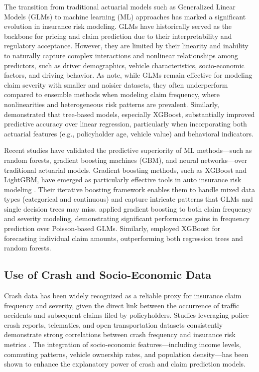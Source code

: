 \documentclass[
  number,
  review,
  3p]{elsarticle}
\begin{document}
The transition from traditional actuarial models such as Generalized
Linear Models (GLMs) to machine learning (ML) approaches has marked a
significant evolution in insurance risk modeling. GLMs have historically
served as the backbone for pricing and claim prediction due to their
interpretability and regulatory acceptance. However, they are limited by
their linearity and inability to naturally capture complex interactions
and nonlinear relationships among predictors, such as driver
demographics, vehicle characteristics, socio-economic factors, and
driving behavior. As \citet{clemente} note, while GLMs remain effective
for modeling claim severity with smaller and noisier datasets, they
often underperform compared to ensemble methods when modeling claim
frequency, where nonlinearities and heterogeneous risk patterns are
prevalent. Similarly, \citet{jonkheijm} demonstrated that tree-based
models, especially XGBoost, substantially improved predictive accuracy
over linear regression, particularly when incorporating both actuarial
features (e.g., policyholder age, vehicle value) and behavioral
indicators.

Recent studies have validated the predictive superiority of ML
methods---such as random forests, gradient boosting machines (GBM), and
neural networks---over traditional actuarial models. Gradient boosting
methods, such as XGBoost and LightGBM, have emerged as particularly
effective tools in auto insurance risk modeling \citep{henckaerts}.
Their iterative boosting framework enables them to handle mixed data
types (categorical and continuous) and capture intricate patterns that
GLMs and single decision trees may miss. \citet{clemente} applied
gradient boosting to both claim frequency and severity modeling,
demonstrating significant performance gains in frequency prediction over
Poisson-based GLMs. Similarly, \citet{jonkheijm} employed XGBoost for
forecasting individual claim amounts, outperforming both regression
trees and random forests.

\subsection{\texorpdfstring{\textbf{Use of Crash and Socio-Economic
Data}}{Use of Crash and Socio-Economic Data}}\label{use-of-crash-and-socio-economic-data}

Crash data has been widely recognized as a reliable proxy for insurance
claim frequency and severity, given the direct link between the
occurrence of traffic accidents and subsequent claims filed by
policyholders. Studies leveraging police crash reports, telematics, and
open transportation datasets consistently demonstrate strong
correlations between crash frequency and insurance risk metrics
\citep{takale}. The integration of socio-economic features---including
income levels, commuting patterns, vehicle ownership rates, and
population density---has been shown to enhance the explanatory power of
crash and claim prediction models.
\end{document}
